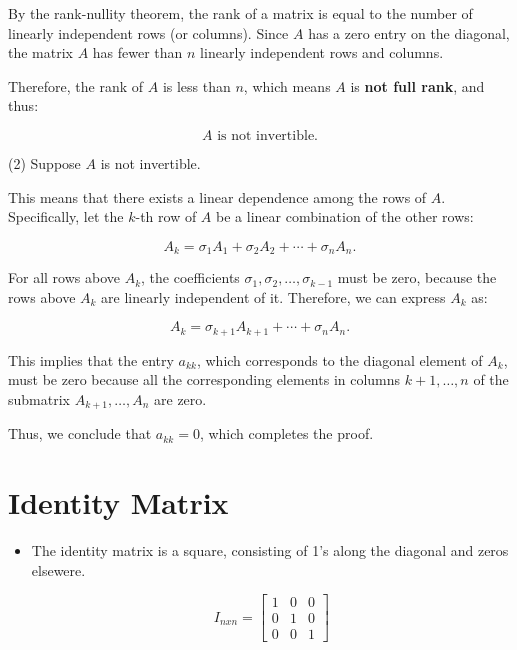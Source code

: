\documentclass{article}
\begin{document}
By the rank-nullity theorem, the rank of a matrix is equal to the number of linearly independent rows (or columns). Since \( A \) has a zero entry on the diagonal, the matrix \( A \) has fewer than \( n \) linearly independent rows and columns.

Therefore, the rank of \( A \) is less than \( n \), which means \( A \) is \textbf{not full rank}, and thus:

\[
A \text{ is not invertible.}
\]

(2) Suppose \( A \) is not invertible. 

This means that there exists a linear dependence among the rows of \( A \). Specifically, let the \( k \)-th row of \( A \) be a linear combination of the other rows:

\[
A_k = \sigma_1 A_1 + \sigma_2 A_2 + \cdots + \sigma_n A_n.
\]

For all rows above \( A_k \), the coefficients \( \sigma_1, \sigma_2, \dots, \sigma_{k-1} \) must be zero, because the rows above \( A_k \) are linearly independent of it. Therefore, we can express \( A_k \) as:

\[
A_k = \sigma_{k+1} A_{k+1} + \cdots + \sigma_n A_n.
\]

This implies that the entry \( a_{kk} \), which corresponds to the diagonal element of \( A_k \), must be zero because all the corresponding elements in columns \( k+1, \dots, n \) of the submatrix \( A_{k+1}, \dots, A_n \) are zero.

Thus, we conclude that \( a_{kk} = 0 \), which completes the proof.


\section{Identity Matrix}
\begin{itemize}
	\item The identity matrix is a square, consisting of 1's along the diagonal and zeros elsewere.
	
	
    \[
    I_{nxn} = \begin{bmatrix}
    1& 0 & 0 \\
    0 & 1 & 0 \\
    0 & 0 & 1
    \end{bmatrix}
    \]
\end{itemize}
\end{document}
